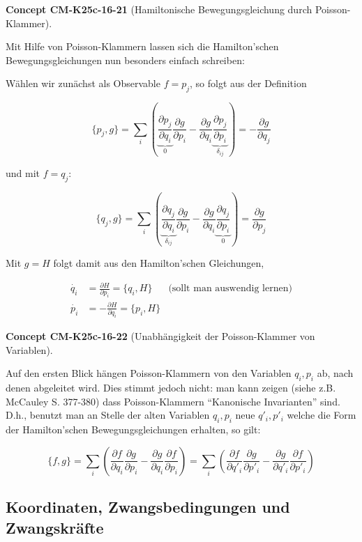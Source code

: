 \documentclass[10pt, letterpaper]{article}
\newcommand{\CustomHeading}[3]{%
  \par\medskip\noindent%
  \textbf{#1 #2} \textnormal{(#3)}.\enskip%
}
\newenvironment{CONC}[2]{\CustomHeading{Concept}{#1}{#2}}{}
\begin{document}
\begin{CONC}{CM-K25c-16-21}{Hamiltonische Bewegungsgleichung durch Poisson-Klammer}
Mit Hilfe von Poisson-Klammern lassen sich die Hamilton'schen Bewegungsgleichungen nun besonders einfach schreiben:

Wählen wir zunächst als Observable $f = p_j$, so folgt aus der Definition

\[\{p_j,g\} = \sum_i \left(\underbrace{\frac{\partial p_j}{\partial q_i}}_{0}\frac{\partial g}{\partial p_i} - \frac{\partial g}{\partial q_i}\underbrace{\frac{\partial p_j}{\partial p_i}}_{\delta_{ij}}\right) = -\frac{\partial g}{\partial q_j}\]

und mit $f = q_j$:

\[\{q_j,g\} = \sum_i \left(\underbrace{\frac{\partial q_j}{\partial q_i}}_{\delta_{ij}}\frac{\partial g}{\partial p_i} - \frac{\partial g}{\partial q_i}\underbrace{\frac{\partial q_j}{\partial p_i}}_{0}\right) = \frac{\partial g}{\partial p_j}\]

Mit $g = H$ folgt damit aus den Hamilton'schen Gleichungen,

\[\boxed{\begin{aligned}
\dot{q_i} &= \frac{\partial H}{\partial p_i} = \{q_i,H\} & \text{(sollt man auswendig lernen)} \\
\dot{p_i} &= -\frac{\partial H}{\partial q_i} = \{p_i,H\}
\end{aligned}}\]
\end{CONC}

\begin{CONC}{CM-K25c-16-22}{Unabhängigkeit der Poisson-Klammer von Variablen}
Auf den ersten Blick hängen Poisson-Klammern von den Variablen $q_i,p_i$ ab, nach denen abgeleitet wird. Dies stimmt jedoch nicht: man kann zeigen (siehe z.B. McCauley S. 377-380) dass Poisson-Klammern ``Kanonische Invarianten'' sind. D.h., benutzt man an Stelle der alten Variablen $q_i,p_i$ neue $q'_i,p'_i$ welche die Form der Hamilton'schen Bewegungsgleichungen erhalten, so gilt:

\[\{f,g\} = \sum_i \left(\frac{\partial f}{\partial q_i}\frac{\partial g}{\partial p_i} - \frac{\partial g}{\partial q_i}\frac{\partial f}{\partial p_i}\right) = \sum_i \left(\frac{\partial f}{\partial q'_i}\frac{\partial g}{\partial p'_i} - \frac{\partial g}{\partial q'_i}\frac{\partial f}{\partial p'_i}\right)\]
\end{CONC}

\subsection{Koordinaten, Zwangsbedingungen und Zwangskräfte}
\end{document}
